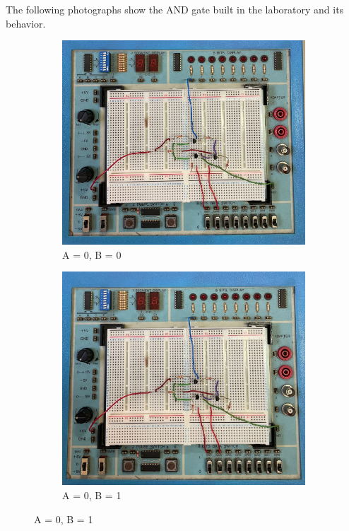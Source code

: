     \noindent
    The following photographs show the AND gate built in the laboratory and its behavior.
    \begin{figure}[H]
        \centering

        \begin{subfigure}{0.45\textwidth}
            \centering
            \includegraphics[width=\linewidth]{figures/photos/AND/00.png}
            \caption{A = 0, B = 0}
        \end{subfigure}
        \hfill
        \begin{subfigure}{0.45\textwidth}
            \centering
            \includegraphics[width=\linewidth]{figures/photos/AND/01.png}
            \caption{A = 0, B = 1}
        \end{subfigure}


\end{figure}
